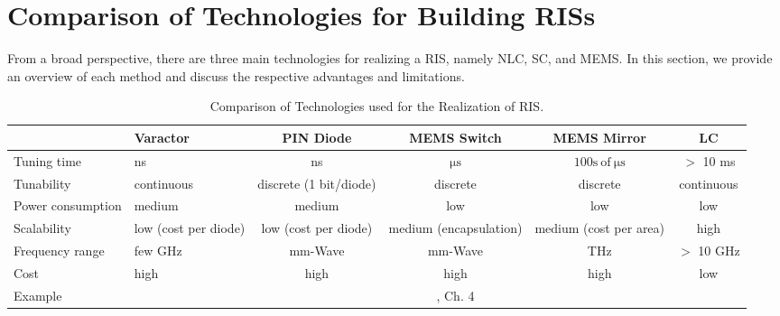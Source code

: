 
\section{Comparison of Technologies for Building \glspl{RIS}}
From a broad perspective, there are three main technologies for realizing a \gls{RIS}, namely \gls{NLC}, \gls{SC}, and \gls{MEMS}. In this section, we provide an overview of each method and discuss the respective advantages and limitations. 


\begin{table*}
\centering
\caption{Comparison of Technologies used for the Realization of RIS.}\label{tab:comparison}
\begin{tabular}{llcccc}
\hline
                  & Varactor                                 & PIN Diode                                & \gls{MEMS} Switch                 & \gls{MEMS} Mirror                  & LC                                                            \\ \hline
Tuning time       & ns                                       & ns                                       & $\mathrm{\mu s}$                                        &$\mathrm{100s \: of \: \mu s}$                                     & $>$ 10 ms                                                      \\
Tunability        & continuous                               & discrete (1 bit/diode)                   & discrete                                       & discrete                                            & continuous                                                    \\
Power consumption & medium                                   & medium                                   & low                                            & low                                                 & low                                                           \\
Scalability       & low (cost per diode)                     & low (cost per diode)                     & medium (encapsulation)                          & medium (cost per area)                              & high                                                          \\
Frequency range   & few GHz                                  & mm-Wave                                  & mm-Wave                                        & THz                                                 & $>$ 10 GHz                                                    \\
Cost              & high                                     & high                                     & high                                           & high                                                & low                                                           \\
Example           & \cite{tawk2012varactor} & \cite{tang2020wireless} & \cite{ferrari2022reconfigurable}, Ch. 4 & \cite{schmitt20213} & \cite{neuder2023compact, karabey20122} \\ \hline
\end{tabular}
\end{table*}


